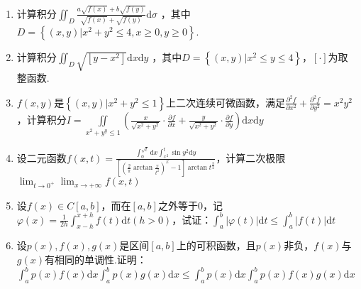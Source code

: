 \begin{enumerate}
	\item 计算积分$\iint_{D} \frac{a \sqrt{f(x)}+b \sqrt{f(y)}}{\sqrt{f(x)}+\sqrt{f(y)}} \mathrm{d}\sigma$ ，其中$D=\left\{(x, y) | x^{2}+y^{2} \leqslant 4, x \geqslant 0, y \geqslant 0\right\}$.
	\begin{solution}
	\end{solution}
	\item 计算积分$\iint_{D} \sqrt{\left[y-x^{2}\right]} \mathrm{d} x \mathrm{d} y$ ，其中$D=\left\{(x, y) | x^{2} \leqslant y \leqslant 4\right\}$，$[\cdot]$为取整函数.
	\begin{solution}
	\end{solution}
	\item $f(x,y)$是$\left\{(x, y) | x^{2}+y^{2} \leqslant 1\right\}$上二次连续可微函数，满足$\frac{\partial^{2} f}{\partial x^{2}}+\frac{\partial^{2} f}{\partial y^{2}}=x^{2} y^{2}$，计算积分$I=\iint\limits_{x^{2}+y^{y} \leqslant 1}\left(\frac{x}{\sqrt{x^{2}+y^{2}}} \cdot \frac{\partial f}{\partial x}+\frac{y}{\sqrt{x^{2}+y^{2}}} \cdot \frac{\partial f}{\partial y}\right) \mathrm{d} x \mathrm{d} y$
	\begin{solution}
	\end{solution}
	\item 设二元函数$f(x, t)=\frac{\int_{0}^{\sqrt{t}} \mathrm{d} x \int_{x^{2}}^{t} \sin y^{2} \mathrm{d} y}{\left[\left(\frac{2}{\pi} \arctan \frac{x}{t^{2}}\right)^{x}-1\right] \arctan t^{\frac{3}{2}}}$，计算二次极限$\lim _{t \rightarrow 0^{+}} \lim _{x \rightarrow+\infty} f(x, t)$
	\begin{solution}
	\end{solution}
	\item 设$f(x)\in C[a,b]$，而在$[a,b]$之外等于0，记$\varphi(x)=\frac{1}{2 h} \int_{x-h}^{x+h} f(t) \mathrm{d} t(h>0)$，试证：$\int_{a}^{b}|\varphi(t)| \mathrm{d} t \leqslant \int_{a}^{b}|f(t)| \mathrm{d} t$
	\begin{solution}
	\end{solution}
	
	\item 设$p(x),f(x),g(x)$是区间$[a,b]$上的可积函数，且$p(x)$非负，$f(x)$与$g(x)$有相同的单调性.证明：$\int_{a}^{b} p(x) f(x) \mathrm{d} x \int_{a}^{b} p(x) g(x) \mathrm{d} x \leqslant \int_{a}^{b} p(x) \mathrm{d} x \int_{a}^{b} p(x) f(x) g(x) \mathrm{d} x$
	\begin{solution}
	\end{solution}
	

\end{enumerate}

